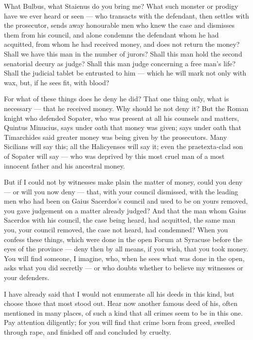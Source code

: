  What Bulbus, what Staienus do you bring me? What such monster or prodigy have we ever heard or seen --- who transacts with the defendant, then settles with the prosecutor, sends away honourable men who knew the case and dismisses them from his council, and alone condemns the defendant whom he had acquitted, from whom he had received money, and does not return the money? Shall we have this man in the number of jurors? Shall this man hold the second senatorial decury as judge? Shall this man judge concerning a free man's life? Shall the judicial tablet be entrusted to him --- which he will mark not only with wax, but, if he sees fit, with blood?

 For what of these things does he deny he did? That one thing only, what is necessary --- that he received money. Why should he not deny it? But the Roman knight who defended Sopater, who was present at all his counsels and matters, Quintus Minucius, says under oath that money was given; says under oath that Timarchides said greater money was being given by the prosecutors. Many Sicilians will say this; all the Halicyenses will say it; even the praetexta-clad son of Sopater will say --- who was deprived by this most cruel man of a most innocent father and his ancestral money.

 But if I could not by witnesses make plain the matter of money, could you deny --- or will you now deny --- that, with your council dismissed, with the leading men who had been on Gaius Sacerdos's council and used to be on yours removed, you gave judgement on a matter already judged? And that the man whom Gaius Sacerdos with his council, the case being heard, had acquitted, the same man you, your council removed, the case not heard, had condemned? When you confess these things, which were done in the open Forum at Syracuse before the eyes of the province --- deny then by all means, if you wish, that you took money. You will find someone, I imagine, who, when he sees what was done in the open, asks what you did secretly --- or who doubts whether to believe my witnesses or your defenders.

 I have already said that I would not enumerate all his deeds in this kind, but choose those that most stood out. Hear now another famous deed of his, often mentioned in many places, of such a kind that all crimes seem to be in this one. Pay attention diligently; for you will find that crime born from greed, swelled through rape, and finished off and concluded by cruelty.

